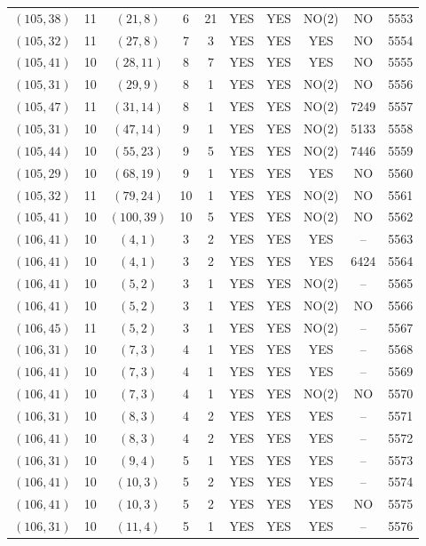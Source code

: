 \begin{longtable}{|c|c|c|c|c|c|c|c|c|c|}
$(105, 38)$ & 11 & $(21, 8)$ & 6 & 21 & YES & YES & NO(2) & NO & 5553\\
$(105, 32)$ & 11 & $(27, 8)$ & 7 & 3 & YES & YES & YES & NO & 5554\\
$(105, 41)$ & 10 & $(28, 11)$ & 8 & 7 & YES & YES & YES & NO & 5555\\
$(105, 31)$ & 10 & $(29, 9)$ & 8 & 1 & YES & YES & NO(2) & NO & 5556\\
$(105, 47)$ & 11 & $(31, 14)$ & 8 & 1 & YES & YES & NO(2) & 7249 & 5557\\
$(105, 31)$ & 10 & $(47, 14)$ & 9 & 1 & YES & YES & NO(2) & 5133 & 5558\\
$(105, 44)$ & 10 & $(55, 23)$ & 9 & 5 & YES & YES & NO(2) & 7446 & 5559\\
$(105, 29)$ & 10 & $(68, 19)$ & 9 & 1 & YES & YES & YES & NO & 5560\\
$(105, 32)$ & 11 & $(79, 24)$ & 10 & 1 & YES & YES & NO(2) & NO & 5561\\
$(105, 41)$ & 10 & $(100, 39)$ & 10 & 5 & YES & YES & NO(2) & NO & 5562\\
$(106, 41)$ & 10 & $(4, 1)$ & 3 & 2 & YES & YES & YES & -- & 5563\\
$(106, 41)$ & 10 & $(4, 1)$ & 3 & 2 & YES & YES & YES & 6424 & 5564\\
$(106, 41)$ & 10 & $(5, 2)$ & 3 & 1 & YES & YES & NO(2) & -- & 5565\\
$(106, 41)$ & 10 & $(5, 2)$ & 3 & 1 & YES & YES & NO(2) & NO & 5566\\
$(106, 45)$ & 11 & $(5, 2)$ & 3 & 1 & YES & YES & NO(2) & -- & 5567\\
$(106, 31)$ & 10 & $(7, 3)$ & 4 & 1 & YES & YES & YES & -- & 5568\\
$(106, 41)$ & 10 & $(7, 3)$ & 4 & 1 & YES & YES & YES & -- & 5569\\
$(106, 41)$ & 10 & $(7, 3)$ & 4 & 1 & YES & YES & NO(2) & NO & 5570\\
$(106, 31)$ & 10 & $(8, 3)$ & 4 & 2 & YES & YES & YES & -- & 5571\\
$(106, 41)$ & 10 & $(8, 3)$ & 4 & 2 & YES & YES & YES & -- & 5572\\
$(106, 31)$ & 10 & $(9, 4)$ & 5 & 1 & YES & YES & YES & -- & 5573\\
$(106, 41)$ & 10 & $(10, 3)$ & 5 & 2 & YES & YES & YES & -- & 5574\\
$(106, 41)$ & 10 & $(10, 3)$ & 5 & 2 & YES & YES & YES & NO & 5575\\
$(106, 31)$ & 10 & $(11, 4)$ & 5 & 1 & YES & YES & YES & -- & 5576\\

\end{longtable}
